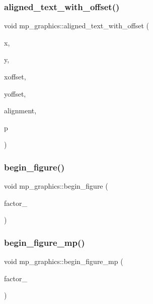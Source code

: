 \subsubsection{\texorpdfstring{aligned\+\_\+text\+\_\+with\+\_\+offset()}{aligned\_text\_with\_offset()}}
{\footnotesize\ttfamily void mp\+\_\+graphics\+::aligned\+\_\+text\+\_\+with\+\_\+offset (\begin{DoxyParamCaption}\item[{\mbox{\hyperlink{galois_8h_a09fddde158a3a20bd2dcadb609de11dc}{I\+NT}}}]{x,  }\item[{\mbox{\hyperlink{galois_8h_a09fddde158a3a20bd2dcadb609de11dc}{I\+NT}}}]{y,  }\item[{\mbox{\hyperlink{galois_8h_a09fddde158a3a20bd2dcadb609de11dc}{I\+NT}}}]{xoffset,  }\item[{\mbox{\hyperlink{galois_8h_a09fddde158a3a20bd2dcadb609de11dc}{I\+NT}}}]{yoffset,  }\item[{const char $\ast$}]{alignment,  }\item[{const char $\ast$}]{p }\end{DoxyParamCaption})}

\mbox{\label{classmp__graphics_a5755257d778fb161984a756d0ad9c600}} 
\subsubsection{\texorpdfstring{begin\+\_\+figure()}{begin\_figure()}}
{\footnotesize\ttfamily void mp\+\_\+graphics\+::begin\+\_\+figure (\begin{DoxyParamCaption}\item[{\mbox{\hyperlink{galois_8h_a09fddde158a3a20bd2dcadb609de11dc}{I\+NT}}}]{factor\+\_ }\end{DoxyParamCaption})}

\mbox{\label{classmp__graphics_aab98691d8a4a65a5ac8ed06e8f71c640}} 
\subsubsection{\texorpdfstring{begin\+\_\+figure\+\_\+mp()}{begin\_figure\_mp()}}
{\footnotesize\ttfamily void mp\+\_\+graphics\+::begin\+\_\+figure\+\_\+mp (\begin{DoxyParamCaption}\item[{\mbox{\hyperlink{galois_8h_a09fddde158a3a20bd2dcadb609de11dc}{I\+NT}}}]{factor\+\_ }\end{DoxyParamCaption})}

